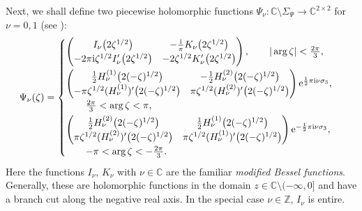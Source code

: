 \documentclass[11pt]{article}
\numberwithin{equation}{section}
\newcommand{\Z}{\mathbb{Z}}
\newcommand{\C}{\mathbb{C}}
\newcommand{\I}{\mathrm{i}}
\newcommand{\E}{\mathrm{e}}
\numberwithin{equation}{section}
\begin{document}
Next, we shall define two piecewise holomorphic functions $\Psi_\nu\colon \C \setminus \Sigma_\Psi \to \C^{2\times2}$ for $\nu = 0, 1$ (see \cite[equation~(6.51)]{KMVV}):
\begin{align*}
 \Psi_\nu(\zeta) =
 \begin{cases}
 \begin{pmatrix}
 I_\nu\big(2\zeta^{1/2}\big) & -\frac{\I}{\pi} K_\nu\big(2\zeta^{1/2}\big)
 \\
 -2\pi \I \zeta^{1/2} I_\nu'\big(2\zeta^{1/2}\big) & -2 \zeta^{1/2} K_\nu'\big(2\zeta^{1/2}\big)
 \end{pmatrix}, \qquad |\arg \zeta | < \frac{2\pi}{3},\vspace{1mm}
 \\
 \begin{pmatrix}
 \frac{1}{2}H^{(1)}_\nu\big(2(-\zeta)^{1/2}\big) & -\frac{1}{2}H^{(2)}_\nu\big(2(-\zeta)^{1/2}\big)
 \\
 -\pi\zeta^{1/2}(H^{(1)}_\nu)'\big(2(-\zeta)^{1/2}\big) & \pi\zeta^{1/2}(H^{(2)}_\nu)'\big(2(-\zeta)^{1/2}\big)
 \end{pmatrix}\E^{\frac{1}{2}\pi\I\nu \sigma_3},
 \\
 \qquad\frac{2\pi}{3} < \arg \zeta < \pi,\vspace{1mm}
 \\
 \begin{pmatrix}
 \frac{1}{2}H^{(2)}_\nu\big(2(-\zeta)^{1/2}\big) & \frac{1}{2}H^{(1)}_\nu\big(2(-\zeta)^{1/2}\big)
 \\
 \pi\zeta^{1/2}(H^{(2)}_\nu)'\big(2(-\zeta)^{1/2}\big) & \pi\zeta^{1/2}(H^{(1)}_\nu)'\big(2(-\zeta)^{1/2}\big)
 \end{pmatrix}\E^{-\frac{1}{2} \pi\I\nu \sigma_3},
 \\
 \qquad-\pi < \arg \zeta < -\tfrac{2\pi}{3}.
 \end{cases}
\end{align*}
Here the functions $I_\nu$, $K_\nu$ with $\nu \in \C$ are the familiar \emph{modified Bessel functions}. Generally, these are holomorphic functions in the domain $z\in \C\setminus (-\infty, 0]$ and have a branch cut along the negative real axis. In the special case $\nu \in \Z$, $I_\nu$ is entire.
\end{document}
